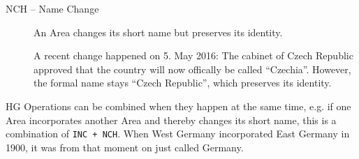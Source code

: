 \begin{description}
\begin{footnotesize}
  \end{footnotesize}
  \item[NCH -- Name Change]
  An Area changes its short name but preserves its identity. \\[0.25em]
  \begin{footnotesize}
    A recent change happened on 5. May 2016: The cabinet of Czech Republic approved that the country will now offically be called ``Czechia''. However, the formal name stays ``Czech Republic'', which preserves its identity.
  \end{footnotesize}
\end{description}

HG Operations can be combined when they happen at the same time, e.g. if one Area incorporates another Area and thereby changes its short name, this is a combination of \texttt{INC + NCH}. When West Germany incorporated East Germany in 1900, it was from that moment on just called Germany.

